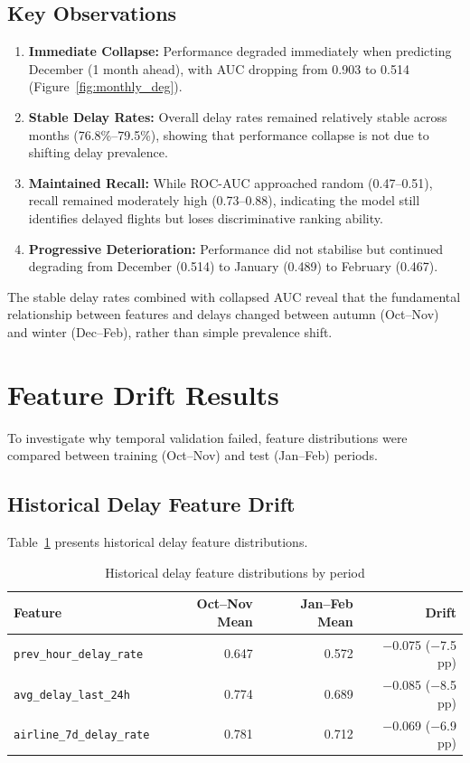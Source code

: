 \documentclass{report}
\begin{document}
\subsection{Key Observations}

\begin{enumerate}
\item \textbf{Immediate Collapse:} Performance degraded immediately when
  predicting December (1 month ahead), with AUC dropping from 0.903 to
  0.514 (Figure~\ref{fig:monthly_deg}).
\item \textbf{Stable Delay Rates:} Overall delay rates remained relatively
  stable across months (76.8\%--79.5\%), showing that performance collapse
  is not due to shifting delay prevalence.
\item \textbf{Maintained Recall:} While ROC-AUC approached random
  (0.47--0.51), recall remained moderately high (0.73--0.88), indicating
  the model still identifies delayed flights but loses discriminative ranking
  ability.
\item \textbf{Progressive Deterioration:} Performance did not stabilise but
  continued degrading from December (0.514) to January (0.489) to February
  (0.467).
\end{enumerate}

The stable delay rates combined with collapsed AUC reveal that the
fundamental relationship between features and delays changed between autumn
(Oct--Nov) and winter (Dec--Feb), rather than simple prevalence shift.

\section{Feature Drift Results}
\label{sec:feature_drift}

To investigate why temporal validation failed, feature distributions were
compared between training (Oct--Nov) and test (Jan--Feb) periods.

\subsection{Historical Delay Feature Drift}

Table~\ref{tab:hist_drift} presents historical delay feature distributions.

\begin{table}[H]
\centering
\caption{Historical delay feature distributions by period}
\label{tab:hist_drift}
\begin{tabular}{lrrr}
\toprule
\textbf{Feature} & \textbf{Oct--Nov Mean} & \textbf{Jan--Feb Mean} &
  \textbf{Drift} \\
\midrule
\texttt{prev\_hour\_delay\_rate}   & 0.647 & 0.572 & $-$0.075 ($-$7.5 pp) \\
\texttt{avg\_delay\_last\_24h}     & 0.774 & 0.689 & $-$0.085 ($-$8.5 pp) \\
\texttt{airline\_7d\_delay\_rate}  & 0.781 & 0.712 & $-$0.069 ($-$6.9 pp) \\
\bottomrule
\end{tabular}
\end{table}
\end{document}
